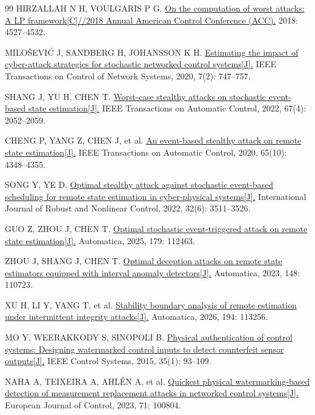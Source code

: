 \begin{thebibliography}{99}
HIRZALLAH N H, VOULGARIS P G.
\href{https://doi.org/10.23919/ACC.2018.8431670}{On the computation of worst attacks: A LP framework[C]//2018 Annual American Control Conference (ACC).}
2018: 4527--4532.

MILO\v SEVI\'C J, SANDBERG H, JOHANSSON K H.
\href{https://doi.org/10.1109/TCNS.2019.2940253}{Estimating the impact of cyber-attack strategies for stochastic networked control systems[J].}
IEEE Transactions on Control of Network Systems, 2020, 7(2): 747--757.

SHANG J, YU H, CHEN T.
\href{https://doi.org/10.1109/TAC.2021.3071948}{Worst-case stealthy attacks on stochastic event-based state estimation[J].}
IEEE Transactions on Automatic Control, 2022, 67(4): 2052--2059.

CHENG P, YANG Z, CHEN J, et al.
\href{https://doi.org/10.1109/TAC.2019.2956021}{An event-based stealthy attack on remote state estimation[J].}
IEEE Transactions on Automatic Control, 2020, 65(10): 4348--4355.

SONG Y, YE D.
\href{https://doi.org/10.1002/rnc.5967}{Optimal stealthy attack against stochastic event-based scheduling for remote state estimation in cyber-physical systems[J].}
International Journal of Robust and Nonlinear Control, 2022, 32(6): 3511--3526.

GUO Z, ZHOU J, CHEN T.
\href{https://doi.org/10.1016/j.automatica.2025.112463}{Optimal stochastic event-triggered attack on remote state estimation[J].}
Automatica, 2025, 179: 112463.

ZHOU J, SHANG J, CHEN T.
\href{https://doi.org/10.1016/j.automatica.2022.110723}{Optimal deception attacks on remote state estimators equipped with interval anomaly detectors[J].}
Automatica, 2023, 148: 110723.

XU H, LI Y, YANG T, et al.
\href{https://doi.org/10.1016/j.automatica.2026.113256}{Stability boundary analysis of remote estimation under intermittent integrity attacks[J].}
Automatica, 2026, 194: 113256.

MO Y, WEERAKKODY S, SINOPOLI B.
\href{https://doi.org/10.1109/MCS.2014.2364724}{Physical authentication of control systems: Designing watermarked control inputs to detect counterfeit sensor outputs[J].}
IEEE Control Systems, 2015, 35(1): 93--109.

NAHA A, TEIXEIRA A, AHL\'EN A, et al.
\href{https://doi.org/10.1016/j.ejcon.2023.100804}{Quickest physical watermarking-based detection of measurement replacement attacks in networked control systems[J].}
European Journal of Control, 2023, 71: 100804.


\end{thebibliography}
